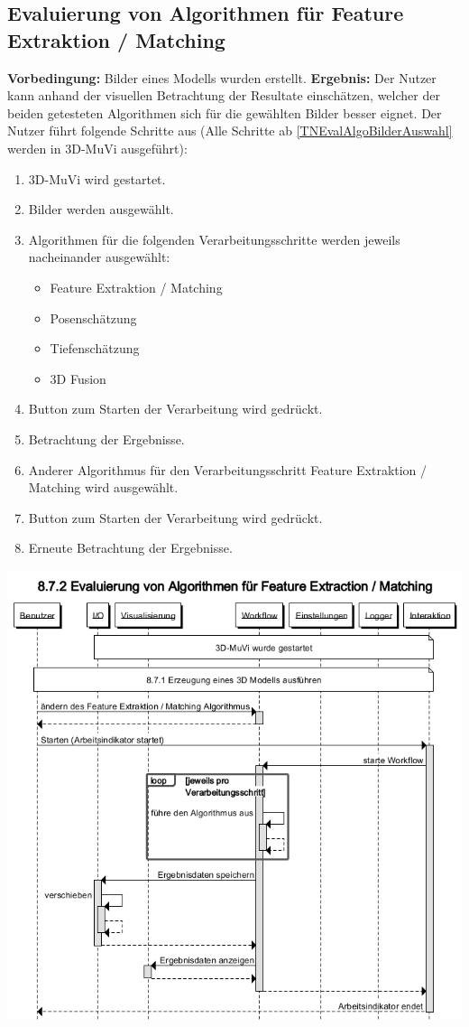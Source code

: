 \subsection{Evaluierung von Algorithmen für Feature Extraktion / Matching}
\label{TNEvalAlgo}
\textbf{Vorbedingung:} Bilder eines Modells wurden erstellt. \newline
\textbf{Ergebnis:} Der Nutzer kann anhand der visuellen Betrachtung der Resultate einschätzen, welcher der beiden getesteten Algorithmen sich für die gewählten Bilder besser eignet. \newline
Der Nutzer führt folgende Schritte aus (Alle Schritte ab \ref{TNEvalAlgoBilderAuswahl} werden in 3D-MuVi ausgeführt):
\begin{enumerate}
	\item 3D-MuVi wird gestartet.
	\item \label{TNEvalAlgoBilderAuswahl} Bilder werden ausgewählt.
	\item Algorithmen für die folgenden Verarbeitungsschritte werden jeweils nacheinander ausgewählt:
	\begin{itemize}
		\item Feature Extraktion / Matching
		\item Posenschätzung
		\item Tiefenschätzung
		\item 3D Fusion
	\end{itemize}
	\item Button zum Starten der Verarbeitung wird gedrückt.
	\item Betrachtung der Ergebnisse.
	\item Anderer Algorithmus für den Verarbeitungsschritt Feature Extraktion / Matching wird ausgewählt.
	\item Button zum Starten der Verarbeitung wird gedrückt.
	\item Erneute Betrachtung der Ergebnisse.
\end{enumerate}
\includegraphics[width=1.05\textwidth]{img/872_Seqz.png}

